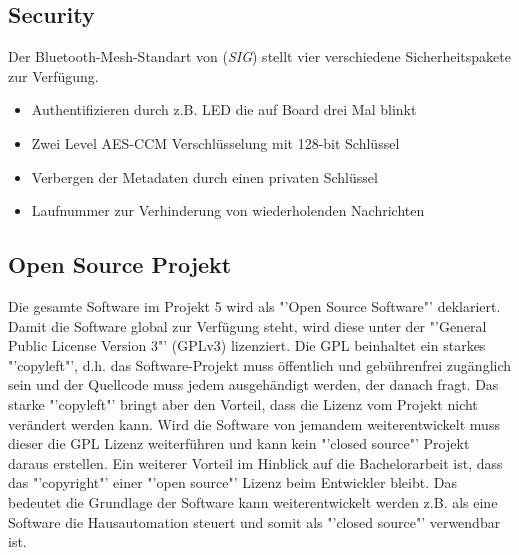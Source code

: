 \subsection{Security}\label{subsec:Security}
Der Bluetooth-Mesh-Standart von (\textit{SIG}) stellt vier verschiedene Sicherheitspakete zur Verfügung.\cite{nordic_semiconductor_nordic_2019} 

 \begin{itemize} 
 	\item Authentifizieren durch z.B. LED die auf Board drei Mal blinkt 
 	\item Zwei Level AES-CCM Verschlüsselung mit 128-bit Schlüssel
 	\item Verbergen der Metadaten durch einen privaten Schlüssel
 	\item Laufnummer zur Verhinderung von wiederholenden Nachrichten   
 \end{itemize}


\subsection{Open Source Projekt}\label{subsec:OSP}
Die gesamte Software im Projekt 5 wird als "'Open Source Software"' deklariert. Damit die Software global zur Verfügung steht, wird diese unter der "'General Public License Version 3"' (GPLv3) lizenziert. Die GPL beinhaltet ein starkes "'copyleft"', d.h. das Software-Projekt muss öffentlich und gebührenfrei zugänglich sein und der Quellcode muss jedem ausgehändigt werden, der danach fragt. Das starke "'copyleft"' bringt aber den Vorteil, dass die Lizenz vom Projekt nicht verändert werden kann. Wird die Software von jemandem weiterentwickelt muss dieser die GPL Lizenz weiterführen und kann kein "'closed source"' Projekt daraus erstellen. Ein weiterer Vorteil im Hinblick auf die Bachelorarbeit ist, dass das "'copyright"' einer "'open source"' Lizenz beim Entwickler bleibt. Das bedeutet die Grundlage der Software kann weiterentwickelt werden z.B. als eine Software die Hausautomation steuert und somit als "'closed source"' verwendbar ist.\cite{jaeger_was_2018}


